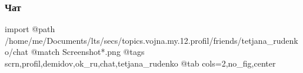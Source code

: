  
 
 
 
 

\subsubsection{Чат}

\ifcmt
  import
  @path /home/me/Documents/lts/secs/topics.vojna.my.12.profil/friends/tetjana_rudenko/chat
  @match Screenshot*.png
  @tags scrn,profil,demidov,ok_ru,chat,tetjana_rudenko
  @tab cols=2,no_fig,center
\fi


